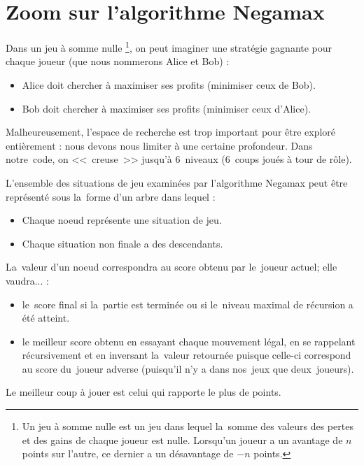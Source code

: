 \section{Zoom sur l'algorithme Negamax}

Dans un jeu à somme nulle
\footnote{Un jeu à somme nulle est un jeu dans lequel la~somme des valeurs des pertes et des gains de chaque joueur est nulle. Lorsqu'un joueur a un avantage de $n$ points sur l'autre, ce dernier a un désavantage de $-n$ points.}, 
on peut imaginer une stratégie gagnante pour chaque joueur (que nous nommerons Alice et Bob) : 
\begin{itemize}
	\item Alice doit chercher à maximiser ses profits (minimiser ceux de Bob).
	\item Bob doit chercher à maximiser ses profits (minimiser ceux d'Alice).
\end{itemize}

Malheureusement, l'espace de recherche est trop important pour être exploré entièrement : 
nous devons nous limiter à une certaine profondeur. Dans notre~code, on <<~creuse~>> jusqu'à 
6~niveaux (6~coups joués à tour de rôle).

L'ensemble des situations de jeu examinées par l'algorithme Negamax 
peut être représenté sous la~forme d'un arbre dans lequel :
\begin{itemize}
	\item Chaque noeud représente une situation de jeu.
    \item Chaque situation non finale a des descendants.
\end{itemize}

La~valeur d'un noeud correspondra au score obtenu par le~joueur actuel; elle vaudra... :
\begin{itemize}
	\item le~score final si la~partie est terminée ou si le~niveau maximal de récursion a été atteint.
    \item le meilleur score obtenu en essayant chaque mouvement légal, en se rappelant récursivement 
            et en inversant la~valeur retournée puisque celle-ci correspond au score du~joueur adverse 
            (puisqu'il n'y a dans nos~jeux que deux~joueurs).
\end{itemize}

Le meilleur coup à jouer est celui qui rapporte le plus de points.